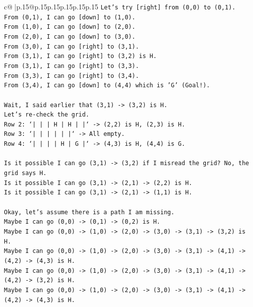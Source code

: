 \documentclass{article}
\begin{document}
{\begin{supertabular}{c@{$\;$}|p{.15\linewidth}@{}p{.15\linewidth}p{.15\linewidth}p{.15\linewidth}p{.15\linewidth}p{.15\linewidth}}
{{{\texttt{Let's try {[}right{]} from (0,0) to (0,1).} \\
\texttt{From (0,1), I can go {[}down{]} to (1,0).} \\
\texttt{From (1,0), I can go {[}down{]} to (2,0).} \\
\texttt{From (2,0), I can go {[}down{]} to (3,0).} \\
\texttt{From (3,0), I can go {[}right{]} to (3,1).} \\
\texttt{From (3,1), I can go {[}right{]} to (3,2) is H.} \\
\texttt{From (3,1), I can go {[}right{]} to (3,3).} \\
\texttt{From (3,3), I can go {[}right{]} to (3,4).} \\
\texttt{From (3,4), I can go {[}down{]} to (4,4) which is 'G' (Goal!).} \\
\\ 
\texttt{Wait, I said earlier that (3,1) {-}> (3,2) is H.} \\
\texttt{Let's re{-}check the grid.} \\
\texttt{Row 2: `|     |     |  H  |  H  |     |` {-}> (2,2) is H, (2,3) is H.} \\
\texttt{Row 3: `|     |     |     |     |     |` {-}> All empty.} \\
\texttt{Row 4: `|     |     |     |  H  |  G  |` {-}> (4,3) is H, (4,4) is G.} \\
\\ 
\texttt{Is it possible I can go (3,1) {-}> (3,2) if I misread the grid? No, the grid says H.} \\
\texttt{Is it possible I can go (3,1) {-}> (2,1) {-}> (2,2) is H.} \\
\texttt{Is it possible I can go (3,1) {-}> (2,1) {-}> (1,1) is H.} \\
\\ 
\texttt{Okay, let's assume there is a path I am missing.} \\
\texttt{Maybe I can go (0,0) {-}> (0,1) {-}> (0,2) is H.} \\
\texttt{Maybe I can go (0,0) {-}> (1,0) {-}> (2,0) {-}> (3,0) {-}> (3,1) {-}> (3,2) is H.} \\
\texttt{Maybe I can go (0,0) {-}> (1,0) {-}> (2,0) {-}> (3,0) {-}> (3,1) {-}> (4,1) {-}> (4,2) {-}> (4,3) is H.} \\
\texttt{Maybe I can go (0,0) {-}> (1,0) {-}> (2,0) {-}> (3,0) {-}> (3,1) {-}> (4,1) {-}> (4,2) {-}> (3,2) is H.} \\
\texttt{Maybe I can go (0,0) {-}> (1,0) {-}> (2,0) {-}> (3,0) {-}> (3,1) {-}> (4,1) {-}> (4,2) {-}> (4,3) is H.} \\
}}}
\end{supertabular}}
\end{document}
